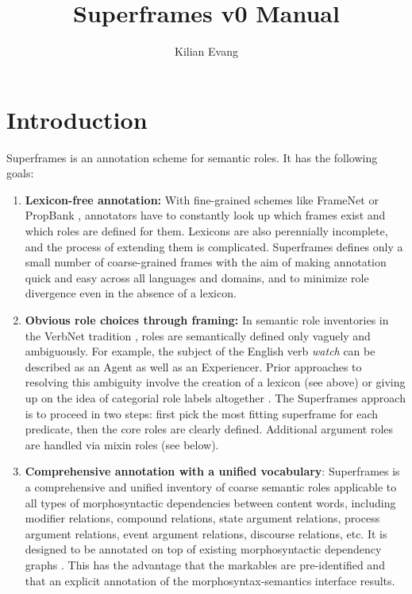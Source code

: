 \documentclass[a4paper]{article}
\title{Superframes v0 Manual}
\author{Kilian Evang}
\begin{document}
\maketitle

\tableofcontents

\clearpage
\section{Introduction}

Superframes is an annotation scheme for semantic roles. It has the following goals:

\begin{enumerate}
    \item \textbf{Lexicon-free annotation:} With fine-grained schemes like FrameNet \citep{baker-etal-1998-berkeley-framenet} or PropBank \citep{palmer-etal-2005-proposition}, annotators have to constantly look up which frames exist and which roles are defined for them. Lexicons are also perennially incomplete, and the process of extending them is complicated. Superframes defines only a small number of coarse-grained frames with the aim of making annotation quick and easy across all languages and domains, and to minimize role divergence even in the absence of a lexicon.
    \item \textbf{Obvious role choices through framing:} In semantic role inventories in the VerbNet tradition \citep{kipper-schuler-2005-verbnet}, roles are semantically defined only vaguely and ambiguously. For example, the subject of the English verb \emph{watch} can be described as an Agent as well as an Experiencer. Prior approaches to resolving this ambiguity involve the creation of a lexicon (see above) or giving up on the idea of categorial role labels altogether \citep{white-etal-2016-universal}. The Superframes approach is to proceed in two steps: first pick the most fitting superframe for each predicate, then the core roles are clearly defined. Additional argument roles are handled via mixin roles (see below).
    \item \textbf{Comprehensive annotation with a unified vocabulary}: Superframes is a comprehensive and unified inventory of coarse semantic roles applicable to all types of morphosyntactic dependencies between content words, including modifier relations, compound relations, state argument relations, process argument relations, event argument relations, discourse relations, etc. It is designed to be annotated on top of existing morphosyntactic dependency graphs \citep[e.g., Universal Dependencies; ][]{de-marneffe-etal-2021-universal}. This has the advantage that the markables are pre-identified and that an explicit annotation of the morphosyntax-semantics interface results.

\end{enumerate}
\end{document}
